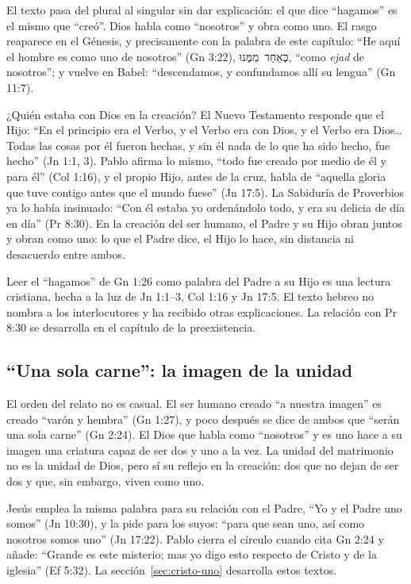 \documentclass[11pt,letterpaper]{article}
\newcommand{\heb}[1]{\mbox{\foreignlanguage{hebrew}{#1}}}
\begin{document}
El texto pasa del plural al singular sin dar explicación: el que dice ``hagamos'' es el mismo que ``creó''. Dios habla como ``nosotros'' y obra como uno. El rasgo reaparece en el Génesis, y precisamente con la palabra de este capítulo: ``He aquí el hombre es como uno de nosotros'' (Gn 3:22), \heb{כְּאַחַד מִמֶּנּוּ}, ``como \emph{ejad} de nosotros''; y vuelve en Babel: ``descendamos, y confundamos allí su lengua'' (Gn 11:7).

¿Quién estaba con Dios en la creación? El Nuevo Testamento responde que el Hijo: ``En el principio era el Verbo, y el Verbo era con Dios, y el Verbo era Dios\ldots{} Todas las cosas por él fueron hechas, y sin él nada de lo que ha sido hecho, fue hecho'' (Jn 1:1, 3). Pablo afirma lo mismo, ``todo fue creado por medio de él y para él'' (Col 1:16), y el propio Hijo, antes de la cruz, habla de ``aquella gloria que tuve contigo antes que el mundo fuese'' (Jn 17:5). La Sabiduría de Proverbios ya lo había insinuado: ``Con él estaba yo ordenándolo todo, y era su delicia de día en día'' (Pr 8:30). En la creación del ser humano, el Padre y su Hijo obran juntos y obran como uno: lo que el Padre dice, el Hijo lo hace, sin distancia ni desacuerdo entre ambos.

\begin{nota}[Precisión]
Leer el ``hagamos'' de Gn 1:26 como palabra del Padre a su Hijo es una lectura cristiana, hecha a la luz de Jn 1:1--3, Col 1:16 y Jn 17:5. El texto hebreo no nombra a los interlocutores y ha recibido otras explicaciones. La relación con Pr 8:30 se desarrolla en el capítulo de la preexistencia.
\end{nota}

\subsection{``Una sola carne'': la imagen de la unidad}
El orden del relato no es casual. El ser humano creado ``a nuestra imagen'' es creado ``varón y hembra'' (Gn 1:27), y poco después se dice de ambos que ``serán una sola carne'' (Gn 2:24). El Dios que habla como ``nosotros'' y es uno hace a su imagen una criatura capaz de ser dos y uno a la vez. La unidad del matrimonio no es la unidad de Dios, pero sí su reflejo en la creación: dos que no dejan de ser dos y que, sin embargo, viven como uno.

Jesús emplea la misma palabra para su relación con el Padre, ``Yo y el Padre uno somos'' (Jn 10:30), y la pide para los suyos: ``para que sean uno, así como nosotros somos uno'' (Jn 17:22). Pablo cierra el círculo cuando cita Gn 2:24 y añade: ``Grande es este misterio; mas yo digo esto respecto de Cristo y de la iglesia'' (Ef 5:32). La sección~\ref{sec:cristo-uno} desarrolla estos textos.
\end{document}
